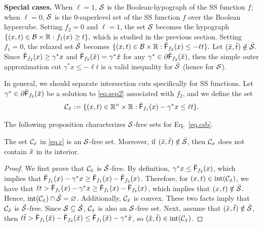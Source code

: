 \textbf{Special cases. } When $ \ell = 1$, $\mathcal S$ is the Boolean-hypograph of the SS function $f$; when $ \ell = 0$,  $\mathcal S$ is the 0-superlevel set  of the SS function $f$ over the Boolean hypercube. Setting $f_2 = 0$ and $ \ell = 1 $, the set $\mathcal S$  becomes the hypograph
$
    \{(x, t) \in \mathcal B \times \mathbb R: f_1(x) \ge t \},
$
which is studied in the previous section. Setting $f_1 = 0$, the relaxed set $\bar{\mathcal S}$ becomes
$
    \{(x, t) \in \mathcal B \times \mathbb R: \bar{\mathsf F}_{f_2} (x) \le -\ell t\}.
$
Let $(\tilde{x}, \tilde{t}) \notin \bar{\mathcal S}$. Since $\bar{\mathsf F}_{f_2} (x) \ge \gamma^\ast x$ and $\bar{\mathsf F}_{f_2} (\tilde{x}) = \gamma^\ast \tilde{x}$  for any $\gamma^\ast \in \partial{\bar{\mathsf F}_{f_2} }(\tilde{x})$, then the simple outer approximation cut $ \gamma^\ast x \le -\ell t$ is a valid inequality for $\bar{\mathcal S}$ (hence for $\mathcal S$).







In general, we should separate intersection cuts specifically for SS functions. Let $\gamma^\ast \in \partial{\bar{\mathsf F}_{f_2} }(\tilde{x})$ be a solution to \eqref{eq.sep2} associated with $f_2$, and we define the  set
\begin{equation}
\label{eq.c}
	 \mathcal C_{\tilde{x}} := \{(x, t) \in \mathbb R^n \times \mathbb R:  \bar{\mathsf F}_{f_1} (x) - \gamma^\ast x   \le\ell t\}.
\end{equation}
 
 The following proposition characterizes $\mathcal S$-free sets for Eq.~\eqref{eq.csb}.
\begin{proposition}
\label{prop.dsfree}
The set $\mathcal C_{\tilde{x}}$ in \eqref{eq.c} is an $\mathcal S$-free set. Moreover, if $(\tilde{x}, \tilde{t}) \notin \bar{\mathcal S}$, then $\mathcal C_{\tilde{x}}$ does not contain $\tilde{x}$ in its interior.
\end{proposition}
\begin{proof}
We first prove that $\mathcal C_{\tilde{x}}$ is $\bar{\mathcal S}$-free. By definition, $\gamma^\ast x \le \bar{\mathsf F}_{f_2} (x)$, which implies that $ \bar{\mathsf F}_{f_1} (x) - \gamma^\ast x  \ge \bar{\mathsf F}_{f_1} (x) - \bar{\mathsf F}_{f_2} (x)  $. Therefore, for $(x,t) \in \operatorname{int}(\mathcal C_{\tilde{x}})$, we have that $\ell t >   \bar{\mathsf F}_{f_1} (x) - \gamma^\ast x  \ge \bar{\mathsf F}_{f_1} (x) - \bar{\mathsf F}_{f_2} (x) $, which implies that $(x,t) \notin \bar{\mathcal S}$. Hence, $\operatorname{int}(\mathcal C_{\tilde{x}}) \cap \bar{\mathcal S} = \varnothing$. Additionally, $\mathcal C_{\tilde{x}}$ is convex. These two facts imply that $\mathcal C_{\tilde{x}}$ is $\bar{\mathcal S}$-free. Since $\mathcal S \subseteq \bar{\mathcal S}$, $\mathcal C_{\tilde{x}}$ is also an $\mathcal S$-free set. Next, assume that $(\tilde{x}, \tilde{t}) \notin \bar{\mathcal S}$, then $ \ell \tilde{t} >  \bar{\mathsf F}_{f_1} (\tilde{x}) - \bar{\mathsf F}_{f_2} (\tilde{x}) \le   \bar{\mathsf F}_{f_1} (\tilde{x}) - \gamma^\ast\tilde{x} $, so $(\tilde{x},\tilde{t}) \in \operatorname{int}(\mathcal C_{\tilde{x}})$.
\end{proof}

